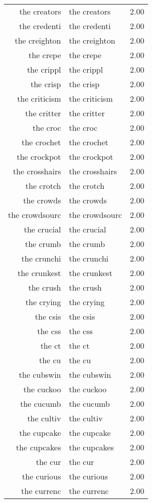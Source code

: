 \begin{table}[ht]
\begin{tabular}{rlr}
  the creators & the creators & 2.00 \\ 
  the credenti & the credenti & 2.00 \\ 
  the creighton & the creighton & 2.00 \\ 
  the crepe & the crepe & 2.00 \\ 
  the crippl & the crippl & 2.00 \\ 
  the crisp & the crisp & 2.00 \\ 
  the criticism & the criticism & 2.00 \\ 
  the critter & the critter & 2.00 \\ 
  the croc & the croc & 2.00 \\ 
  the crochet & the crochet & 2.00 \\ 
  the crockpot & the crockpot & 2.00 \\ 
  the crosshairs & the crosshairs & 2.00 \\ 
  the crotch & the crotch & 2.00 \\ 
  the crowds & the crowds & 2.00 \\ 
  the crowdsourc & the crowdsourc & 2.00 \\ 
  the crucial & the crucial & 2.00 \\ 
  the crumb & the crumb & 2.00 \\ 
  the crunchi & the crunchi & 2.00 \\ 
  the crunkest & the crunkest & 2.00 \\ 
  the crush & the crush & 2.00 \\ 
  the crying & the crying & 2.00 \\ 
  the csis & the csis & 2.00 \\ 
  the css & the css & 2.00 \\ 
  the ct & the ct & 2.00 \\ 
  the cu & the cu & 2.00 \\ 
  the cubswin & the cubswin & 2.00 \\ 
  the cuckoo & the cuckoo & 2.00 \\ 
  the cucumb & the cucumb & 2.00 \\ 
  the cultiv & the cultiv & 2.00 \\ 
  the cupcake & the cupcake & 2.00 \\ 
  the cupcakes & the cupcakes & 2.00 \\ 
  the cur & the cur & 2.00 \\ 
  the curious & the curious & 2.00 \\ 
  the currenc & the currenc & 2.00 \\ 

\end{tabular}
\end{table}
